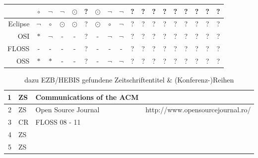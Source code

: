 \documentclass[DIV=calc,BCOR=5mm,11pt,headings=small,oneside,abstract=false, toc=bib]{scrartcl}
\begin{document}
\begin{table}
\begin{center}
\begin{tabular}[h]{|r|c|c|c||c||c|c|c|c||c|c|c|c|c|c|c|c||c|}
  & $\circ$ & $\neg$ & $\neg$ & $\odot$ & ? & $\odot$
  & $\neg$ & $\neg$ & ? & ? & ? & ?
  & ? & ? & ? & ? & ?\\
\hline
Eclipse
  & $\neg$ & $\circ$ & $\odot$ & $\odot$ & ? & $\odot$
  & $\circ$ & $\neg$ & ? & ? & ? & ?
  & ? & ? & ? & ? & ?\\
\hline
\hline
OSI
  & $\ast$ & $\neg$ & - & - & ? & -
  & $\neg$ & $\neg$ & ? & ? & ? & ?
  & ? & ? & ? & ? & ?\\
\hline
FLOSS
  & - & - & - & - & ? & -
  & - & - & ? & ? & ? & ?
  & ? & ? & ? & ? & ?\\
\hline
OSS
  & $\ast$ & $\ast$ & - & - & ? & -
  & $\neg$ & $\neg$ & ? & ? & ? & ?
  & ? & ? & ? & ? & ?\\
\hline

\end{tabular}
\end{center}
\end{table}



\begin{table}
\scriptsize
\caption{dazu EZB/HEBIS gefundene Zeitschriftentitel \& (Konferenz-)Reihen}
\begin{center}
\begin{tabular}[h]{|r|l|l|l|}
\hline 
1 & ZS & Communications of the ACM & \\
\hline 
2 & ZS & Open Source Journal & http://www.opensourcejournal.ro/\\
\hline 
3 & CR & FLOSS 08 - 11 & \\
\hline 
4 & ZS & & \\
\hline 
5 & ZS & & \\
\hline 
\hline
\end{tabular}
\end{center}
\end{table}
\end{document}
